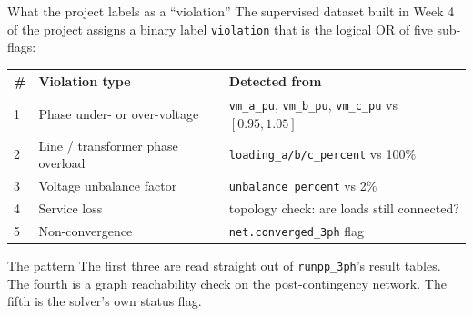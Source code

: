 \documentclass[aspectratio=169,10pt]{beamer}
\newcommand{\code}[1]{\texttt{#1}}
\begin{document}
\begin{frame}{What the project labels as a ``violation''}
The supervised dataset built in Week 4 of the project assigns a binary label \texttt{violation} that is the logical OR of five sub-flags:
\vspace{0.3em}
\centering
\small
\begin{tabular}{lll}
\toprule
\# & Violation type & Detected from \\
\midrule
1 & Phase under- or over-voltage & \code{vm\_a\_pu}, \code{vm\_b\_pu}, \code{vm\_c\_pu} vs $[0.95, 1.05]$ \\
2 & Line / transformer phase overload & \code{loading\_a/b/c\_percent} vs 100\% \\
3 & Voltage unbalance factor & \code{unbalance\_percent} vs 2\% \\
4 & Service loss & topology check: are loads still connected? \\
5 & Non-convergence & \code{net.converged\_3ph} flag \\
\bottomrule
\end{tabular}
\vspace{0.6em}
\begin{block}{The pattern}
The first three are read straight out of \code{runpp\_3ph}'s result tables. The fourth is a graph reachability check on the post-contingency network. The fifth is the solver's own status flag.
\end{block}
\end{frame}
\end{document}
